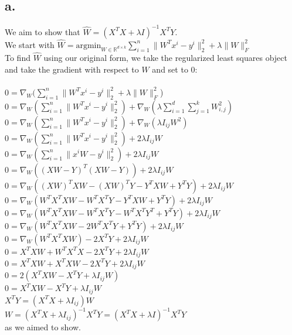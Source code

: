 \documentclass{article}
\newcommand{\field}[1]{\mathbb{#1}}
\newcommand{\1}{\mathbf{1}}
\newcommand{\R}{\field{R}} %
\begin{document}
{\Large 

\subsection*{a.}

We aim to show that $\widehat{W} = (X^TX + \lambda I)^{-1}X^TY$. \\ 
We start with $\widehat{W} = \text{argmin}_{W \in \R^{d \times k}} \sum_{i=1}^{n} \| W^Tx^i - y^i \|_2^2 + \lambda \| W \|_F^2$ \\
To find $\widehat{W}$ using our original form, we take the regularized least squares object and take the gradient with respect to $W$ and set to 0: \\ \\ 
$0 = \nabla_W (\sum_{i=1}^{n} \| W^Tx^i - y^i \|_2^2 + \lambda \| W \|_F^2$) \\
$0 = \nabla_W (\sum_{i=1}^{n} \| W^Tx^i - y^i \|_2^2) + \nabla_W (\lambda \sum_{i=1}^{d}\sum_{j=1}^{k}W_{i,j}^2)$ \\
$0 = \nabla_W (\sum_{i=1}^{n} \| W^Tx^i - y^i \|_2^2) + \nabla_W (\lambda I_{ij} W^2)$ \\
$0 = \nabla_W (\sum_{i=1}^{n} \| W^Tx^i - y^i \|_2^2) + 2 \lambda I_{ij} W$ \\
$0 = \nabla_W (\sum_{i=1}^{n} \| x^iW - y^i \|_2^2) + 2 \lambda I_{ij} W$ \\
$0 = \nabla_W ((XW - Y)^T(XW - Y)) + 2 \lambda I_{ij} W$ \\
$0 = \nabla_W ((XW)^TXW - (XW)^TY - Y^TXW + Y^TY) + 2 \lambda I_{ij} W$ \\
$0 = \nabla_W (W^TX^TXW - W^TX^TY - Y^TXW + Y^TY) + 2 \lambda I_{ij} W$ \\
$0 = \nabla_W (W^TX^TXW - W^TX^TY - W^TX^TY^T + Y^TY) + 2 \lambda I_{ij} W$ \\
$0 = \nabla_W (W^TX^TXW - 2W^TX^TY + Y^TY) + 2 \lambda I_{ij} W$ \\
$0 = \nabla_W (W^TX^TXW) - 2X^TY + 2 \lambda I_{ij} W$ \\
$0 = X^TXW + W^TX^TX - 2X^TY + 2 \lambda I_{ij} W$ \\
$0 = X^TXW + X^TXW - 2X^TY + 2 \lambda I_{ij} W$ \\
$0 = 2(X^TXW - X^TY + \lambda I_{ij} W)$ \\
$0 = X^TXW - X^TY + \lambda I_{ij} W$ \\
$X^TY = (X^TX + \lambda I_{ij}) W$ \\
$W = (X^TX + \lambda I_{ij})^{-1}X^TY = (X^TX + \lambda I)^{-1}X^TY$ \\
as we aimed to show.

}
\end{document}
